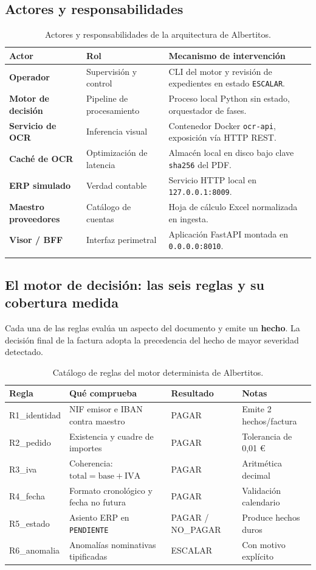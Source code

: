 \documentclass[11pt,a4paper]{article}
\begin{document}
\subsection{Actores y responsabilidades}
\begin{longtable}{>{\bfseries}p{} p{} p{}}
\toprule
Actor & Rol & Mecanismo de intervención \\
\midrule
\endhead
Operador & Supervisión y control & CLI del motor y revisión de expedientes en estado \texttt{ESCALAR}. \\
Motor de decisión & Pipeline de procesamiento & Proceso local Python sin estado, orquestador de fases. \\
Servicio de OCR & Inferencia visual & Contenedor Docker \texttt{ocr-api}, exposición vía HTTP REST. \\
Caché de OCR & Optimización de latencia & Almacén local en disco bajo clave \texttt{sha256} del PDF. \\
ERP simulado & Verdad contable & Servicio HTTP local en \texttt{127.0.0.1:8009}. \\
Maestro proveedores & Catálogo de cuentas & Hoja de cálculo Excel normalizada en ingesta. \\
Visor / BFF & Interfaz perimetral & Aplicación FastAPI montada en \texttt{0.0.0.0:8010}. \\
\bottomrule
\caption{Actores y responsabilidades de la arquitectura de Albertitos.}
\end{longtable}

\subsection{El motor de decisión: las seis reglas y su cobertura medida}
Cada una de las reglas evalúa un aspecto del documento y emite un \textbf{hecho}. La decisión final de la factura adopta la precedencia del hecho de mayor severidad detectado.

\begin{table}[htbp]
\centering
\begin{tabular}{>{\ttfamily}l p{6.5cm} l p{3.5cm}}
\toprule
\textrm{\textbf{Regla}} & \textbf{Qué comprueba} & \textbf{Resultado} & \textbf{Notas} \\
\midrule
R1\_identidad & NIF emisor e IBAN contra maestro & PAGAR & Emite 2 hechos/factura \\
R2\_pedido & Existencia y cuadre de importes & PAGAR & Tolerancia de 0,01 € \\
R3\_iva & Coherencia: $\text{total} = \text{base} + \text{IVA}$ & PAGAR & Aritmética decimal \\
R4\_fecha & Formato cronológico y fecha no futura & PAGAR & Validación calendario \\
R5\_estado & Asiento ERP en \texttt{PENDIENTE} & PAGAR / NO\_PAGAR & Produce hechos duros \\
R6\_anomalia & Anomalías nominativas tipificadas & ESCALAR & Con motivo explícito \\
\bottomrule
\end{tabular}
\caption{Catálogo de reglas del motor determinista de Albertitos.}
\end{table}
\end{document}

